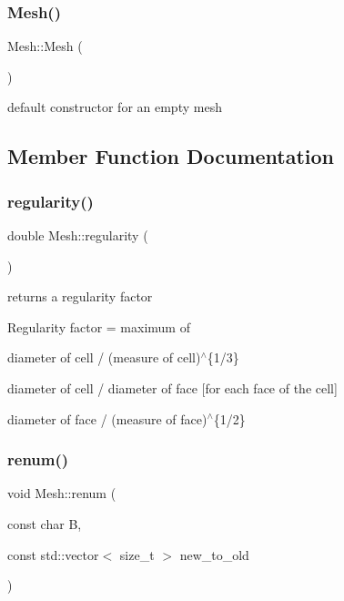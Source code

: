\subsubsection{\texorpdfstring{Mesh()}{Mesh()}}
{\footnotesize\ttfamily Mesh\+::\+Mesh (\begin{DoxyParamCaption}{ }\end{DoxyParamCaption})}

default constructor for an empty mesh 

\subsection{Member Function Documentation}
\mbox{\label{classHArDCore3D_1_1Mesh_a9bdfdf3e4528832da6925f96edc5ad8f}} 
\subsubsection{\texorpdfstring{regularity()}{regularity()}}
{\footnotesize\ttfamily double Mesh\+::regularity (\begin{DoxyParamCaption}{ }\end{DoxyParamCaption})}



returns a regularity factor 

Regularity factor = maximum of
\begin{DoxyItemize}
\item diameter of cell / (measure of cell)$^\wedge$\{1/3\}
\item diameter of cell / diameter of face \mbox{[}for each face of the cell\mbox{]}
\item diameter of face / (measure of face)$^\wedge$\{1/2\} 
\end{DoxyItemize}\mbox{\label{classHArDCore3D_1_1Mesh_af77873bbc892a7a5b37bf4773c55aefc}} 
\subsubsection{\texorpdfstring{renum()}{renum()}}
{\footnotesize\ttfamily void Mesh\+::renum (\begin{DoxyParamCaption}\item[{const char}]{B,  }\item[{const std\+::vector$<$ size\+\_\+t $>$}]{new\+\_\+to\+\_\+old }\end{DoxyParamCaption})}



